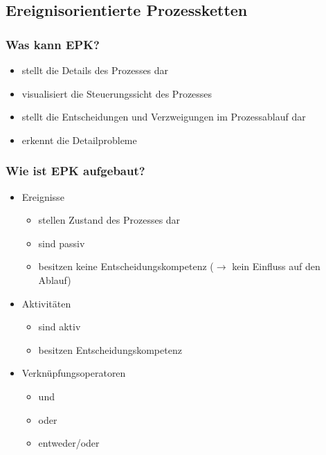 \documentclass[xcolor=dvipsnames]{beamer}
\begin{document}
 \subsection[Ereignisorientierte Prozessketten]{Ereignisorientierte Prozessketten}
 \begin{frame}
  \frametitle{Was kann EPK?}
  \begin{itemize}
  \item stellt die Details des Prozesses dar
  \item visualisiert die Steuerungssicht des Prozesses
  \item stellt die Entscheidungen und Verzweigungen im Prozessablauf dar
  \item erkennt die Detailprobleme
  \end{itemize}
 \end{frame}

  \begin{frame}
  \frametitle{Wie ist EPK aufgebaut?}
  \begin{itemize}
  \item Ereignisse
  \begin{itemize}
    \item stellen Zustand des Prozesses dar
    \item sind passiv
    \item besitzen keine Entscheidungskompetenz ($\rightarrow$ kein Einfluss auf den Ablauf)
  \end{itemize}
  \item Aktivitäten
    \begin{itemize}
    \item sind aktiv
    \item besitzen Entscheidungskompetenz
  \end{itemize}
  \item Verknüpfungsoperatoren
  \begin{itemize}
    \item und
    \item oder
    \item entweder/oder
  \end{itemize}
  \end{itemize}
 \end{frame}
\end{document}
